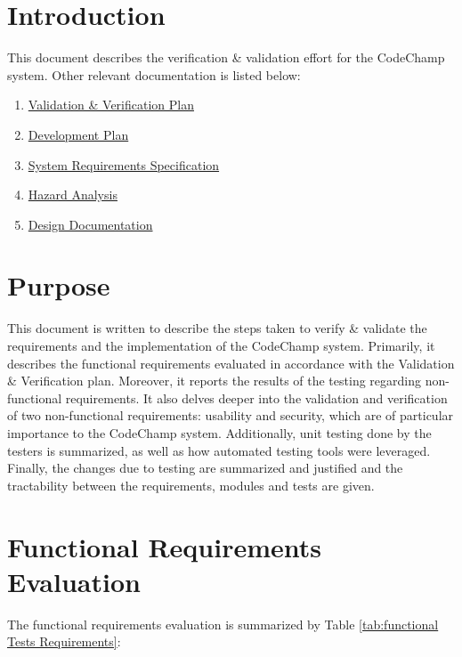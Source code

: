 \documentclass[12pt, titlepage]{article}
\begin{document}
\section{Introduction}
This document describes the verification \& validation effort for the CodeChamp system. Other relevant documentation is listed below:
\begin{enumerate}
    \item \href{https://github.com/Tamas-Leung/CodeChamp/blob/main/docs/VnVPlan}{Validation \& Verification Plan} 
    \item \href{https://github.com/Tamas-Leung/CodeChamp/tree/main/docs/DevelopmentPlan}{Development Plan}
    \item \href{https://github.com/Tamas-Leung/CodeChamp/tree/main/docs/SRS}{System Requirements Specification} 
    \item \href{https://github.com/Tamas-Leung/CodeChamp/blob/main/docs/HazardAnalysis/HazardAnalysis.md}{Hazard Analysis}
    \item \href{https://github.com/Tamas-Leung/CodeChamp/blob/main/docs/Design/SystDesign/SystemDesign.pdf}{Design Documentation}
    
\end{enumerate}

\section{Purpose}

This document is written to describe the steps taken to verify \& validate the  requirements and the implementation of the CodeChamp system. Primarily, it describes the functional requirements evaluated in accordance with the Validation \& Verification plan. Moreover, it reports the results of the testing regarding non-functional requirements. It  also delves deeper into the validation and verification of two non-functional requirements: usability and security, which are of particular importance to the CodeChamp system. Additionally, unit testing done by the testers is summarized, as well as how automated testing tools were leveraged. Finally, the changes due to testing are summarized and justified and the tractability between the requirements, modules and tests are given. 

\section{Functional Requirements Evaluation}
The functional requirements evaluation is summarized by Table \ref{tab:functional Tests Requirements}:
\end{document}
